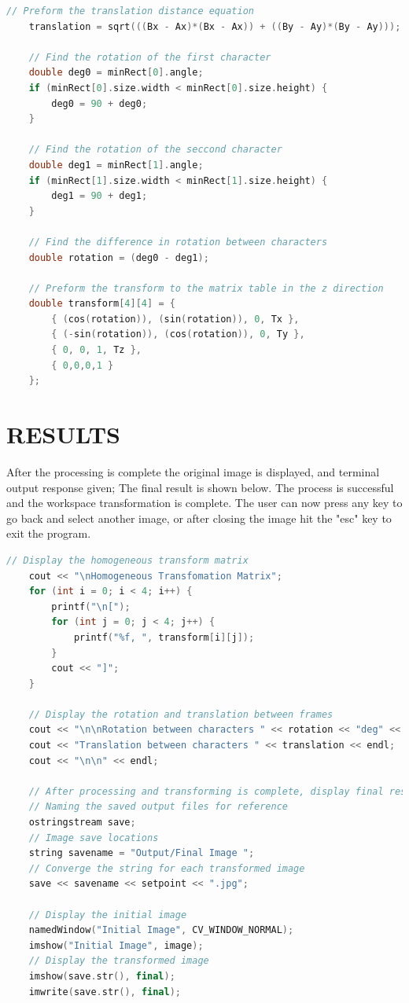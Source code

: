 \documentclass[a4paper, 10pt]{article}
\begin{document}
\begin{lstlisting}[language = C++]
	// Preform the translation distance equation
	translation = sqrt(((Bx - Ax)*(Bx - Ax)) + ((By - Ay)*(By - Ay)));

	// Find the rotation of the first character
	double deg0 = minRect[0].angle;
	if (minRect[0].size.width < minRect[0].size.height) {
		deg0 = 90 + deg0;
	}
	
	// Find the rotation of the seccond character
	double deg1 = minRect[1].angle;
	if (minRect[1].size.width < minRect[1].size.height) {
		deg1 = 90 + deg1;
	}
	
	// Find the difference in rotation between characters
	double rotation = (deg0 - deg1);

	// Preform the transform to the matrix table in the z direction
	double transform[4][4] = {
		{ (cos(rotation)), (sin(rotation)), 0, Tx },
		{ (-sin(rotation)), (cos(rotation)), 0, Ty },
		{ 0, 0, 1, Tz },
		{ 0,0,0,1 }
	};
\end{lstlisting}


\section{RESULTS}

After the processing is complete the original image is displayed, and terminal output response given; The final result is shown below. The process is successful and the workspace transformation is complete. The user can now press any key to go back and select another image, or after closing the image hit the "esc" key to exit the program.

\begin{lstlisting}[language = C++]
	// Display the homogeneous transform matrix 
	cout << "\nHomogeneous Transfomation Matrix";
	for (int i = 0; i < 4; i++) {
		printf("\n[");
		for (int j = 0; j < 4; j++) {
			printf("%f, ", transform[i][j]);
		}
		cout << "]";
	}

	// Display the rotation and translation between frames
	cout << "\n\nRotation between characters " << rotation << "deg" << endl;
	cout << "Translation between characters " << translation << endl;
	cout << "\n\n" << endl;
	
	// After processing and transforming is complete, display final results, and save for reference
	// Naming the saved output files for reference
	ostringstream save;
	// Image save locations
	string savename = "Output/Final Image ";
	// Converge the string for each transformed image
	save << savename << setpoint << ".jpg";
	
	// Display the initial image 
	namedWindow("Initial Image", CV_WINDOW_NORMAL);  
	imshow("Initial Image", image);
	// Display the transformed image
	imshow(save.str(), final);  
	imwrite(save.str(), final);
\end{lstlisting}
\end{document}
